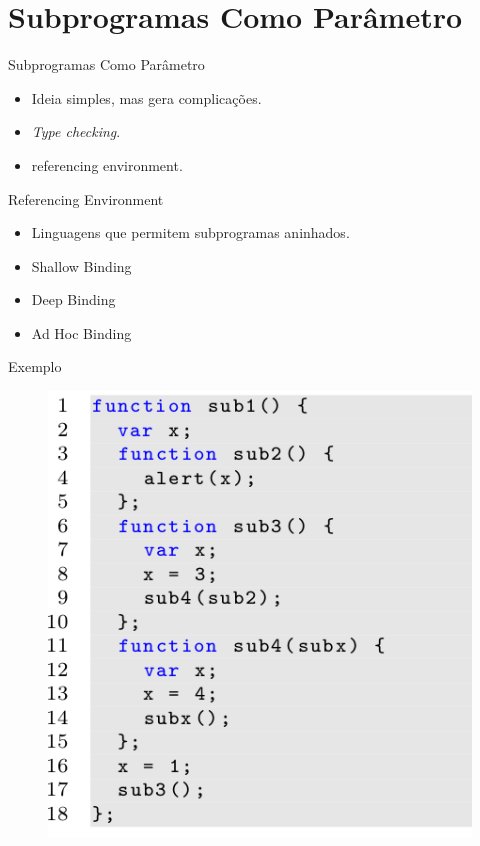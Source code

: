 
\section{Subprogramas Como Parâmetro}
\begin{frame}{Subprogramas Como Parâmetro}
	\begin{itemize}
	  \item Ideia simples, mas gera complicações.
	  \item \emph{Type checking}.
	  \item referencing environment.
	\end{itemize}
\end{frame}

\begin{frame}{Referencing Environment}
	\begin{itemize}
	  \item Linguagens que permitem subprogramas aninhados.
	  \item Shallow Binding
	  \item Deep Binding
	  \item Ad Hoc Binding
	\end{itemize}
\end{frame}

\begin{frame}{Exemplo}
	\begin{figure}[ht!]
		\centering
		\includegraphics[scale=0.4]{./imgs/js-original}
	\end{figure}
\end{frame}

